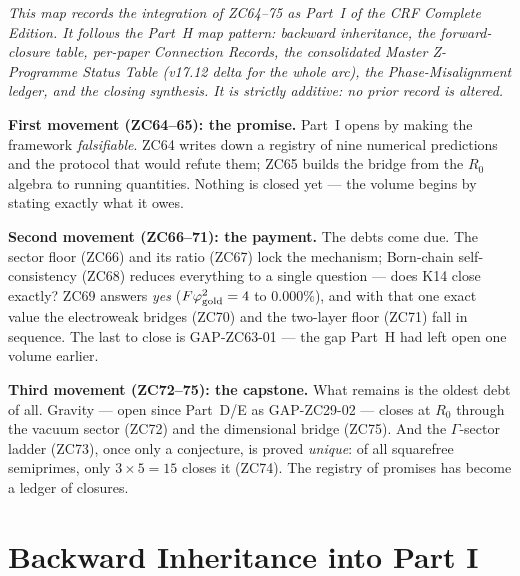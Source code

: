 \documentclass[12pt, a4paper]{article}
\begin{document}
\noindent
\textit{This map records the integration of ZC64--75 as Part~I of the
CRF Complete Edition. It follows the Part~H map pattern: backward
inheritance, the forward-closure table, per-paper Connection Records,
the consolidated \emph{Master Z-Programme Status Table} (v17.12 delta
for the whole arc), the Phase-Misalignment ledger, and the closing
synthesis. It is strictly additive: no prior record is altered.}

\bigskip

\begin{keybox}[title={The arc of Part I --- a story in three movements}]
\textbf{First movement (ZC64--65): the promise.} Part~I opens by making
the framework \emph{falsifiable}. ZC64 writes down a registry of nine
numerical predictions and the protocol that would refute them; ZC65
builds the bridge from the $R_0$ algebra to running quantities. Nothing
is closed yet --- the volume begins by stating exactly what it owes.

\medskip
\textbf{Second movement (ZC66--71): the payment.} The debts come due. The
sector floor (ZC66) and its ratio (ZC67) lock the mechanism; Born-chain
self-consistency (ZC68) reduces everything to a single question --- does
K14 close exactly? ZC69 answers \emph{yes} ($F\varphi_{\rm gold}^{2}=4$
to $0.000\%$), and with that one exact value the electroweak bridges
(ZC70) and the two-layer floor (ZC71) fall in sequence. The last to
close is GAP-ZC63-01 --- the gap Part~H had left open one volume earlier.

\medskip
\textbf{Third movement (ZC72--75): the capstone.} What remains is the
oldest debt of all. Gravity --- open since Part~D/E as GAP-ZC29-02 ---
closes at $R_0$ through the vacuum sector (ZC72) and the dimensional
bridge (ZC75). And the $\Gamma$-sector ladder (ZC73), once only a
conjecture, is proved \emph{unique}: of all squarefree semiprimes, only
$3\times5=15$ closes it (ZC74). The registry of promises has become a
ledger of closures.
\end{keybox}

\bigskip
\section{Backward Inheritance into Part I}
\label{sec:xlviii-backward}
\end{document}
